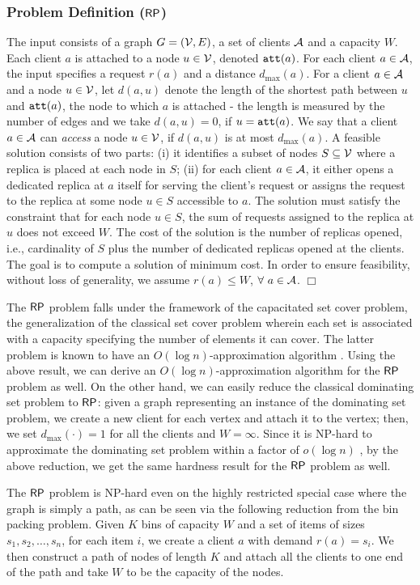 \documentclass[11pt]{article}
\newcommand{\mypara}[1] {\subsubsection*{#1}}
\newcommand{\att} {{\tt att}}
\newcommand{\dmax} {d_{\max}}
\newcommand{\calA} {{\cal A}}
\newcommand{\calV} {{\cal V}}
\newcommand{\RP} {{\sf RP}}
\newcommand{\qed} {\hfill$\Box$}
\begin{document}
\mypara{Problem Definition ($\RP$)}
The input consists of a graph $G=(\calV, E)$, a set of clients $\calA$ and a capacity $W$.
Each client $a$ is attached to a node $u\in \calV$, denoted $\att(a)$.
For each client $a\in \calA$, the input specifies a request $r(a)$ and a distance $\dmax(a)$.
For a client $a\in \calA$ and a node $u\in \calV$, let $d(a, u)$ denote the length of the
shortest path between $u$ and $\att(a)$, the node to which $a$ is attached - the length is measured
 by the number of edges and we take $d(a, u) = 0$, if $u = \att(a)$.
We say that a client $a\in \calA$ can {\em access} a node $u\in \calV$, if $d(a, u)$ is at most $\dmax(a)$.
A feasible solution consists of two parts:
(i) it identifies a subset of nodes $S\subseteq \calV$ where a replica is placed at each node in $S$;
(ii) for each client $a\in \calA$, it either opens a dedicated replica at $a$ itself for serving the client's request
or assigns the request to the replica at some node $u\in S$ accessible to $a$.
The solution must satisfy the constraint that for each node $u\in S$,
the sum of requests assigned to the replica at $u$ does not exceed $W$.
The cost of the solution is the number of replicas opened, i.e., cardinality of $S$ plus
the number of dedicated replicas opened at the clients.
The goal is to compute a solution of minimum cost.
In order to ensure feasibility, without loss of generality, we assume $r(a) \leq W$, $\forall \ a\in \calA$.
\qed

The $\RP$ problem falls under the framework of the capacitated set cover problem,
the generalization of the classical set cover problem wherein each set is
associated with a capacity specifying the number of elements it can cover.
The latter problem is known to have an $O(\log n)$-approximation algorithm \cite{Chuzhoy}.
Using the above result, we can derive an $O(\log n)$-approximation algorithm for the $\RP$ problem as well. 
On the other hand, we can easily reduce the classical dominating set problem to $\RP$:
given a graph representing an instance of the dominating set problem, we create a new client for each vertex and attach it to the vertex;
then, we set $\dmax(\cdot)=1$ for all the clients and $W=\infty$.
Since it is NP-hard to approximate the dominating set problem within a factor of $o(\log n)$ \cite{Feige},
by the above reduction, we get the same hardness result for the $\RP$ problem as well.

The $\RP$ problem is NP-hard even on the highly restricted special case where the graph is simply a path,
as can be seen via the following reduction from the bin packing problem.
Given $K$ bins of capacity $W$ and a set of items of sizes $s_1, s_2, \ldots, s_n$,
for each item $i$, we create a client $a$ with demand $r(a)=s_i$.
We then construct a path of nodes of length $K$ and attach all the clients to one end of the path and take $W$ to be the capacity of the nodes.
\end{document}
